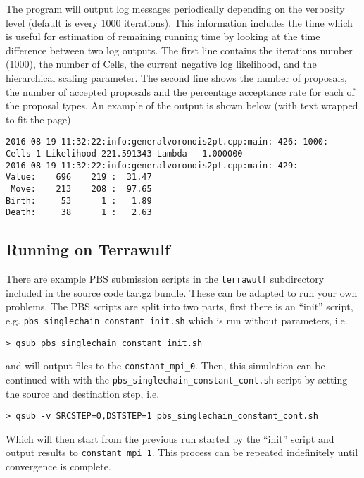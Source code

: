 \documentclass{article}
\begin{document}
The program will output log messages periodically depending on the
verbosity level (default is every 1000 iterations). This information
includes the time which is useful for estimation of remaining running
time by looking at the time difference between two log outputs.  The
first line contains the iterations number (1000), the number of Cells,
the current negative log likelihood, and the hierarchical scaling
parameter. The second line shows the number of proposals, the number
of accepted proposals and the percentage acceptance rate for each of
the proposal types. An example of the output is shown below (with text
wrapped to fit the page)

\begin{verbatim}
2016-08-19 11:32:22:info:generalvoronois2pt.cpp:main: 426: 1000: 
Cells 1 Likelihood 221.591343 Lambda   1.000000
2016-08-19 11:32:22:info:generalvoronois2pt.cpp:main: 429:         
Value:    696    219 :  31.47
 Move:    213    208 :  97.65
Birth:     53      1 :   1.89
Death:     38      1 :   2.63
\end{verbatim}


\subsection{Running on Terrawulf}

There are example PBS submission scripts in the {\tt terrawulf} subdirectory
included in the source code tar.gz bundle. These can be adapted to run your own
problems. The PBS scripts are split into two parts, first there is an ``init''
script, e.g. {\tt pbs\_singlechain\_constant\_init.sh} which is run without
parameters, i.e.

\begin{verbatim}
> qsub pbs_singlechain_constant_init.sh 
\end{verbatim}

and will output files to the {\tt constant\_mpi\_0}. Then, this
simulation can be continued with with the {\tt pbs\_singlechain\_constant\_cont.sh}
script by setting the source and destination step, i.e.

\begin{verbatim}
> qsub -v SRCSTEP=0,DSTSTEP=1 pbs_singlechain_constant_cont.sh
\end{verbatim}

Which will then start from the previous run started by the ``init'' script and
output results to {\tt constant\_mpi\_1}. This process can be repeated indefinitely
until convergence is complete.
\end{document}
